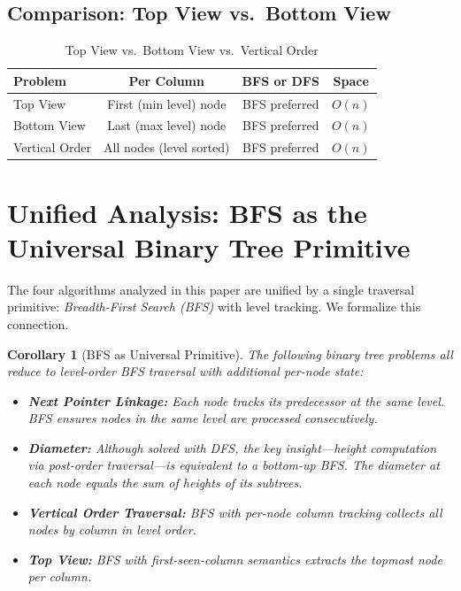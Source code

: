 \documentclass[10pt,journal,compsoc,onecolumn]{IEEEtran}
\newtheorem{corollary}[theorem]{Corollary}
\begin{document}
\subsection{Comparison: Top View vs.\ Bottom View}

\begin{table}[h]
\centering
\caption{Top View vs.\ Bottom View vs.\ Vertical Order}
\begin{tabular}{lccc}
\toprule
\textbf{Problem} & \textbf{Per Column} & \textbf{BFS or DFS} & \textbf{Space} \\
\midrule
Top View & First (min level) node & BFS preferred & $O(n)$ \\
Bottom View & Last (max level) node & BFS preferred & $O(n)$ \\
Vertical Order & All nodes (level sorted) & BFS preferred & $O(n)$ \\
\bottomrule
\end{tabular}
\end{table}

\section{Unified Analysis: BFS as the Universal Binary Tree Primitive}
\label{sec:unified}

The four algorithms analyzed in this paper are unified by a single traversal primitive: \emph{Breadth-First Search (BFS)} with level tracking. We formalize this connection.

\begin{corollary}[BFS as Universal Primitive]
The following binary tree problems all reduce to level-order BFS traversal with additional per-node state:
\begin{itemize}
    \item \textbf{Next Pointer Linkage:} Each node tracks its predecessor at the same level. BFS ensures nodes in the same level are processed consecutively.
    \item \textbf{Diameter:} Although solved with DFS, the key insight---height computation via post-order traversal---is equivalent to a bottom-up BFS. The diameter at each node equals the sum of heights of its subtrees.
    \item \textbf{Vertical Order Traversal:} BFS with per-node column tracking collects all nodes by column in level order.
    \item \textbf{Top View:} BFS with first-seen-column semantics extracts the topmost node per column.
\end{itemize}
\end{corollary}
\end{document}
